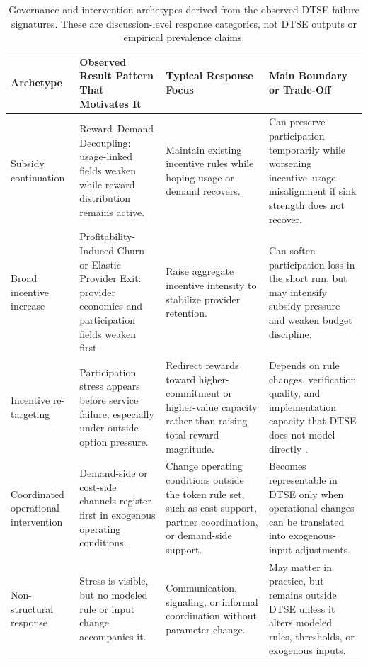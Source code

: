 \begin{table}[ht]
    \centering
    \footnotesize
    \setlength{\tabcolsep}{4pt}
    \renewcommand{\arraystretch}{1.15}
    \begin{tabularx}{\textwidth}{@{}>{\raggedright\arraybackslash}p{}>{\raggedright\arraybackslash}p{}>{\raggedright\arraybackslash}p{}X@{}}
        \toprule
        \textbf{Archetype} & \textbf{Observed Result Pattern That Motivates It} & \textbf{Typical Response Focus} & \textbf{Main Boundary or Trade-Off} \\
        \midrule
        Subsidy continuation & Reward--Demand Decoupling: usage-linked fields weaken while reward distribution remains active. & Maintain existing incentive rules while hoping usage or demand recovers. & Can preserve participation temporarily while worsening incentive--usage misalignment if sink strength does not recover. \\
        \addlinespace
        Broad incentive increase & Profitability-Induced Churn or Elastic Provider Exit: provider economics and participation fields weaken first. & Raise aggregate incentive intensity to stabilize provider retention. & Can soften participation loss in the short run, but may intensify subsidy pressure and weaken budget discipline. \\
        \addlinespace
        Incentive re-targeting & Participation stress appears before service failure, especially under outside-option pressure. & Redirect rewards toward higher-commitment or higher-value capacity rather than raising total reward magnitude. & Depends on rule changes, verification quality, and implementation capacity that DTSE does not model directly \cite{Tan2020, Chiu2024}. \\
        \addlinespace
        Coordinated operational intervention & Demand-side or cost-side channels register first in exogenous operating conditions. & Change operating conditions outside the token rule set, such as cost support, partner coordination, or demand-side support. & Becomes representable in DTSE only when operational changes can be translated into exogenous-input adjustments. \\
        \addlinespace
        Non-structural response & Stress is visible, but no modeled rule or input change accompanies it. & Communication, signaling, or informal coordination without parameter change. & May matter in practice, but remains outside DTSE unless it alters modeled rules, thresholds, or exogenous inputs. \\
        \bottomrule
    \end{tabularx}
    \caption[Governance and intervention archetypes]{Governance and intervention archetypes derived from the observed DTSE failure signatures. These are discussion-level response categories, not DTSE outputs or empirical prevalence claims.}
    \label{tab:governance_intervention_archetypes}
\end{table}

